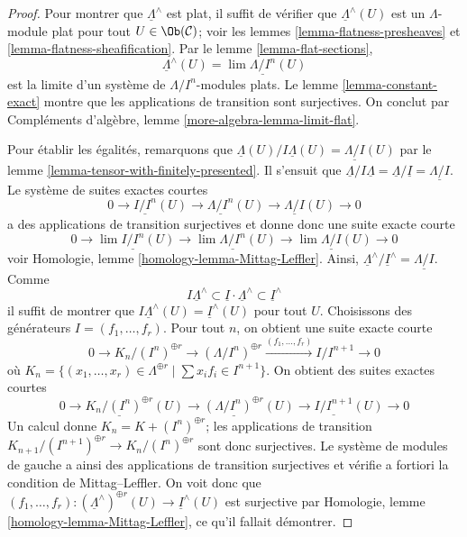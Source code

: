 \begin{proof}
Pour montrer que $\underline{\Lambda}^\wedge$ est plat, il suffit de vérifier
que $\underline{\Lambda}^\wedge(U)$ est un $\Lambda$-module plat pour tout
$U \in \Ob(\mathcal{C})$; voir les lemmes
\ref{lemma-flatness-presheaves} et \ref{lemma-flatness-sheafification}.
Par le lemme \ref{lemma-flat-sections},
$$
\underline{\Lambda}^\wedge(U) = \lim \underline{\Lambda/I^n}(U)
$$
est la limite d'un système de $\Lambda/I^n$-modules plats. Le
lemme \ref{lemma-constant-exact} montre que les applications de transition
sont surjectives. On conclut par Compléments d'algèbre,
lemme \ref{more-algebra-lemma-limit-flat}.

\medskip\noindent
Pour établir les égalités, remarquons que
$\underline{\Lambda}(U)/I\underline{\Lambda}(U) = \underline{\Lambda/I}(U)$
par le lemme \ref{lemma-tensor-with-finitely-presented}. Il s'ensuit que
$\underline{\Lambda}/I\underline{\Lambda} =
\underline{\Lambda}/\underline{I} = \underline{\Lambda/I}$. Le système de
suites exactes courtes
$$
0 \to \underline{I/I^n}(U) \to \underline{\Lambda/I^n}(U) \to
\underline{\Lambda/I}(U) \to 0
$$
a des applications de transition surjectives et donne donc une suite exacte courte
$$
0 \to \lim \underline{I/I^n}(U) \to \lim \underline{\Lambda/I^n}(U) \to
\lim \underline{\Lambda/I}(U) \to 0
$$
voir Homologie, lemme \ref{homology-lemma-Mittag-Leffler}. Ainsi,
$\underline{\Lambda}^\wedge/\underline{I}^\wedge =
\underline{\Lambda/I}$. Comme
$$
I \underline{\Lambda}^\wedge \subset
\underline{I} \cdot \underline{\Lambda}^\wedge \subset
\underline{I}^\wedge
$$
il suffit de montrer que
$I \underline{\Lambda}^\wedge(U) = \underline{I}^\wedge(U)$
pour tout $U$. Choisissons des générateurs $I = (f_1, \ldots, f_r)$.
Pour tout $n$, on obtient une suite exacte courte
$$
0 \to K_n/(I^n)^{\oplus r} \to (\Lambda/I^n)^{\oplus r}
\xrightarrow{(f_1, \ldots, f_r)}
I/I^{n + 1} \to 0
$$
où $K_n =
\{(x_1, \ldots, x_r) \in \Lambda^{\oplus r} \mid \sum x_i f_i \in I^{n + 1}\}$.
On obtient des suites exactes courtes
$$
0 \to \underline{K_n/(I^n)^{\oplus r}}(U) \to
\underline{(\Lambda/I^n)^{\oplus r}}(U) \to
\underline{I/I^{n + 1}}(U) \to 0
$$
Un calcul donne $K_n = K + (I^n)^{\oplus r}$; les applications de transition
$K_{n + 1}/(I^{n + 1})^{\oplus r} \to K_n/(I^n)^{\oplus r}$ sont donc
surjectives. Le système de modules de gauche a ainsi des applications de
transition surjectives et vérifie a fortiori la condition de Mittag--Leffler.
On voit donc que
$(f_1, \ldots, f_r) :
(\underline{\Lambda}^\wedge)^{\oplus r}(U) \to \underline{I}^\wedge(U)$
est surjective par Homologie, lemme \ref{homology-lemma-Mittag-Leffler}, ce
qu'il fallait démontrer.
\end{proof}

